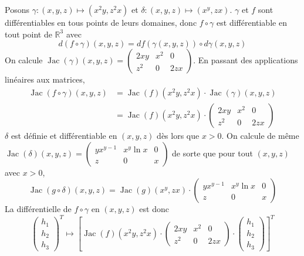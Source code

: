 \documentclass{report}
\begin{document}
\subsection{} \noindent{}\\ 
\\ 
\\
\noindent Posons $\gamma:(x,y,z)\mapsto (x^2y,z^2x)$ et $\delta:(x,y,z)\mapsto (x^y,zx)$.\newline
$\gamma$ et $f$ sont différentiables en tous points de leurs domaines, donc $f\circ \gamma$ est différentiable en tout point de $\mathbb R^3$ avec $$d(f\circ \gamma)(x,y,z) = df(\gamma(x,y,z))\circ d\gamma(x,y,z)$$
On calcule $\operatorname{Jac}(\gamma)(x,y,z)=\begin{pmatrix}
2xy & x^2 & 0 \\
z^2 & 0 & 2zx
\end{pmatrix}$.
En passant des applications linéaires aux matrices, $$\begin{aligned} \operatorname{Jac}(f\circ \gamma)(x,y,z) &= \operatorname{Jac}(f)(x^2y,z^2x)\cdot \operatorname{Jac}(\gamma)(x,y,z)\\
&= \operatorname{Jac}(f)(x^2y,z^2x) \cdot  \begin{pmatrix}
2xy & x^2 & 0 \\
z^2 & 0 & 2zx
\end{pmatrix} \end{aligned}$$\newline
$\delta$ est définie et différentiable en $(x,y,z)$ dès lors que $x>0$. On calcule de même $\operatorname{Jac}(\delta)(x,y,z)=\begin{pmatrix}
yx^{y-1} & x^y\ln x & 0 \\
z & 0 & x
\end{pmatrix}$ de sorte que pour tout $(x,y,z)$ avec $x>0$, $$ \operatorname{Jac}(g\circ \delta)(x,y,z)= \operatorname{Jac}(g)(x^y,zx) \cdot \begin{pmatrix}
yx^{y-1} & x^y\ln x & 0 \\
z & 0 & x
\end{pmatrix}$$
La différentielle de $f\circ \gamma$ en $(x,y,z)$ est donc $$\begin{pmatrix}
h_1 \\
h_2 \\
h_3
\end{pmatrix}^T \mapsto \left[\operatorname{Jac}(f)(x^2y,z^2x) \cdot  \begin{pmatrix}
2xy & x^2 & 0 \\
z^2 & 0 & 2zx
\end{pmatrix}\cdot \begin{pmatrix}
h_1 \\
h_2 \\
h_3
\end{pmatrix}\right]^T$$
\end{document}
